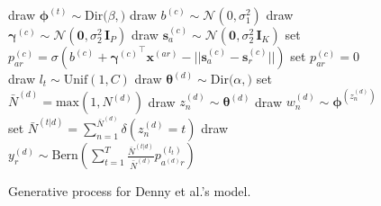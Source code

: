 \documentclass{pnastwo}
\newcommand{\bs}{\boldsymbol{s}}
\newcommand{\bx}{\boldsymbol{x}}
\newcommand{\bzero}{\boldsymbol{0}}
\newcommand{\bgamma}{\boldsymbol{\gamma}}
\newcommand{\bphi}{\boldsymbol{\phi}}
\newcommand{\btheta}{\boldsymbol{\theta}}
\newcommand{\I}{\boldsymbol{\text{I}}}
\newcommand{\Bern}{\text{Bern}}
\newcommand{\Dir}{\text{Dir}}
\newcommand{\Norm}{\mathcal{N}}
\newcommand{\Unif}{\text{Unif}}
\newcommand{\teq}{\!=\!}
\begin{document}
\begin{article}
\begin{figure}[t]
  \caption{Generative process for Denny et al.'s model.}
  \label{alg:generative_process}
  \begin{algorithmic}[1]
    \State draw $\bphi^{(t)} \sim \Dir(\beta, \bm)$
    \EndFor
    \State draw $b^{(c)} \sim \Norm(0, \sigma_1^2)$
    \State draw $\bgamma^{(c)} \sim \Norm(\bzero, \sigma_2^2
    \, \I_P)$
    \State draw $\bs^{(c)}_a \sim \Norm(\bzero,
    \sigma_2^2\, \I_K)$
    \EndFor
    \State set $p^{(c)}_{ar} =
    \sigma(b^{(c)} +
          {\bgamma^{(c)}}^{\top}
          \bx^{(ar)} -
          ||\bs_{a}^{(c)} -
          \bs_{r}^{(c)}||)$
          \Else
          \State set
          $p^{(c)}_{ar}
          = 0$
          \EndIf
          \EndFor
          \EndFor
          \EndFor
          \State draw $l_t \sim \Unif(1, C)$
          \EndFor
    \State draw $\btheta^{(d)} \sim \Dir(\alpha, \bm)$
    \State set $\bar{N}^{(d)} = \textrm{max}(1, N^{(d)})$
    \State draw $z_n^{(d)} \sim \btheta^{(d)}$
    \State draw $w_n^{(d)} \sim
    \bphi^{(z_n^{(d)})}$
    \EndIf
    \EndFor
    \State set
    $\bar{N}^{(t|d)} =
    \sum_{n=1}^{\bar{N}^{(d)}}
    \delta(z_n^{(d)} \teq
    t)$
    \EndFor
    \State
    draw
    $y_r^{(d)} \sim \Bern(\sum_{t=1}^T \frac{\bar{N}^{(t|d)}}{
	\bar{N}^{(d)}}
    p^{(l_t)}_{a^{(d)}r})$
    \EndFor
    \EndFor
    \end{algorithmic}
\end{figure}






\end{article}
\end{document}
